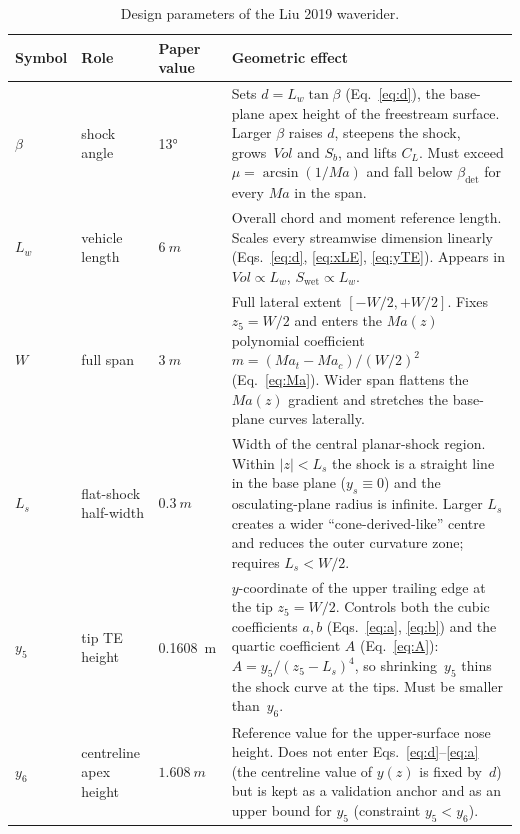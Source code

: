 \documentclass[11pt,a4paper]{article}
\newcommand{\Ma}{\mathit{Ma}}
\newcommand{\Vol}{\mathit{Vol}}
\newcommand{\Swet}{S_{\mathrm{wet}}}
\newcommand{\Sb}{S_{b}}
\newcommand{\Lw}{L_{w}}
\newcommand{\Ls}{L_{s}}
\begin{document}
\begin{table}[h]
\caption{Design parameters of the Liu 2019 waverider.}
\label{tab:params}
\centering
\small
\renewcommand{\arraystretch}{1.15}
\begin{tabular}{@{}lllp{}@{}}
\toprule
Symbol & Role & Paper value & Geometric effect \\
\midrule
$\beta$        & shock angle           & \ang{13}       &
Sets $d=\Lw\tan\beta$ (Eq.~\ref{eq:d}), the base-plane apex height of
the freestream surface. Larger $\beta$ raises $d$, steepens the shock,
grows~$\Vol$ and $\Sb$, and lifts $C_{L}$. Must exceed
$\mu=\arcsin(1/\Ma)$ and fall below $\beta_{\det}$ for every $\Ma$ in
the span. \\

$\Lw$          & vehicle length        & $\SI{6}{m}$    &
Overall chord and moment reference length. Scales every streamwise
dimension linearly (Eqs.~\ref{eq:d}, \ref{eq:xLE}, \ref{eq:yTE}).
Appears in $\Vol\propto\Lw$, $\Swet\propto\Lw$. \\

$W$            & full span             & $\SI{3}{m}$    &
Full lateral extent $[-W/2,+W/2]$. Fixes $z_{5}=W/2$ and enters
the $\Ma(z)$ polynomial coefficient $m=(\Ma_{t}-\Ma_{c})/(W/2)^{2}$
(Eq.~\ref{eq:Ma}). Wider span flattens the $\Ma(z)$ gradient and
stretches the base-plane curves laterally. \\

$\Ls$          & flat-shock half-width & $\SI{0.3}{m}$  &
Width of the central planar-shock region. Within $|z|<\Ls$ the shock
is a straight line in the base plane ($y_{s}\equiv 0$) and the
osculating-plane radius is infinite. Larger $\Ls$ creates a wider
``cone-derived-like'' centre and reduces the outer curvature zone;
requires $\Ls<W/2$. \\

$y_{5}$        & tip TE height         & \SI{0.1608}{m} &
$y$-coordinate of the upper trailing edge at the tip $z_{5}=W/2$.
Controls both the cubic coefficients $a,b$ (Eqs.~\ref{eq:a}, \ref{eq:b})
and the quartic coefficient $A$ (Eq.~\ref{eq:A}): $A=y_{5}/(z_{5}-\Ls)^{4}$,
so shrinking~$y_{5}$ thins the shock curve at the tips. Must be smaller
than~$y_{6}$. \\

$y_{6}$        & centreline apex height& $\SI{1.608}{m}$&
Reference value for the upper-surface nose height. Does not enter
Eqs.~\ref{eq:d}--\ref{eq:a} (the centreline value of $y(z)$ is fixed
by~$d$) but is kept as a validation anchor and as an upper bound for
$y_{5}$ (constraint $y_{5}<y_{6}$). \\


\end{tabular}
\end{table}
\end{document}
